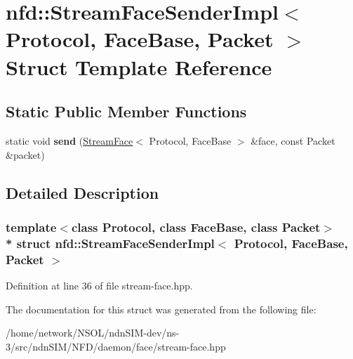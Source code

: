 \hypertarget{structnfd_1_1StreamFaceSenderImpl}{}\section{nfd\+:\+:Stream\+Face\+Sender\+Impl$<$ Protocol, Face\+Base, Packet $>$ Struct Template Reference}
\label{structnfd_1_1StreamFaceSenderImpl}
\subsection*{Static Public Member Functions}
\begin{DoxyCompactItemize}
\item 
static void {\bfseries send} (\hyperlink{classnfd_1_1StreamFace}{Stream\+Face}$<$ Protocol, Face\+Base $>$ \&face, const Packet \&packet)\hypertarget{structnfd_1_1StreamFaceSenderImpl_afe2c8c1b80b767e78e40225f50eb315f}{}\label{structnfd_1_1StreamFaceSenderImpl_afe2c8c1b80b767e78e40225f50eb315f}

\end{DoxyCompactItemize}


\subsection{Detailed Description}
\subsubsection*{template$<$class Protocol, class Face\+Base, class Packet$>$\\*
struct nfd\+::\+Stream\+Face\+Sender\+Impl$<$ Protocol, Face\+Base, Packet $>$}



Definition at line 36 of file stream-\/face.\+hpp.



The documentation for this struct was generated from the following file\+:\begin{DoxyCompactItemize}
\item 
/home/network/\+N\+S\+O\+L/ndn\+S\+I\+M-\/dev/ns-\/3/src/ndn\+S\+I\+M/\+N\+F\+D/daemon/face/stream-\/face.\+hpp\end{DoxyCompactItemize}
